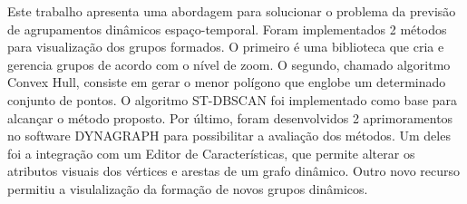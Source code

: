 Este trabalho apresenta uma abordagem para solucionar o problema da previsão de agrupamentos
dinâmicos espaço-temporal. Foram implementados 2 métodos para visualização dos grupos formados.
O primeiro é uma biblioteca que cria e gerencia grupos de acordo com o nível de zoom.
O segundo, chamado algoritmo Convex Hull, consiste em gerar o menor polígono que englobe um determinado
conjunto de pontos. O algoritmo ST-DBSCAN foi implementado como base para alcançar o método proposto.
Por último, foram desenvolvidos 2 aprimoramentos no software DYNAGRAPH para
possibilitar a avaliação dos métodos. Um deles foi a integração com um Editor de
Características, que permite alterar os atributos visuais dos vértices e arestas de um
grafo dinâmico. Outro novo recurso permitiu a visulalização da formação de novos grupos dinâmicos.


